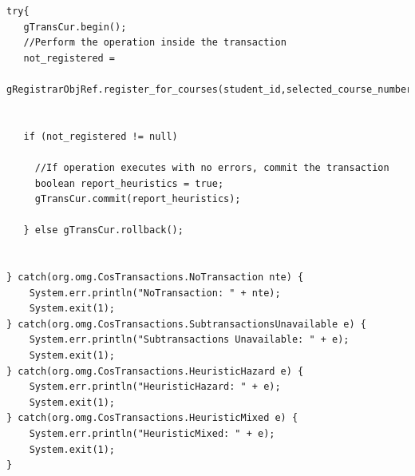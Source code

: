 \begin{lstlisting}[style=Java, caption=Implizite Transaktion \cite{tanenbaum2007verteilte}]
try{
   gTransCur.begin();
   //Perform the operation inside the transaction
   not_registered = 
       gRegistrarObjRef.register_for_courses(student_id,selected_course_numbers);


   if (not_registered != null)

     //If operation executes with no errors, commit the transaction
     boolean report_heuristics = true;
     gTransCur.commit(report_heuristics);

   } else gTransCur.rollback();


} catch(org.omg.CosTransactions.NoTransaction nte) {
    System.err.println("NoTransaction: " + nte);
    System.exit(1);
} catch(org.omg.CosTransactions.SubtransactionsUnavailable e) {
    System.err.println("Subtransactions Unavailable: " + e);
    System.exit(1);
} catch(org.omg.CosTransactions.HeuristicHazard e) {
    System.err.println("HeuristicHazard: " + e);
    System.exit(1);
} catch(org.omg.CosTransactions.HeuristicMixed e) {
    System.err.println("HeuristicMixed: " + e);
    System.exit(1);
}
\end{lstlisting}


